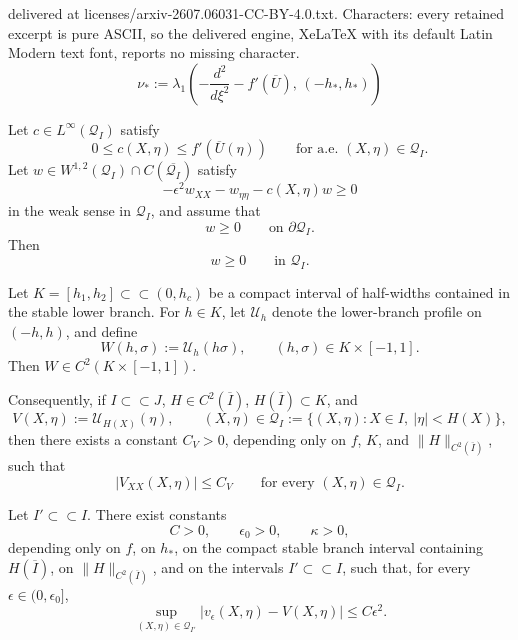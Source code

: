 \documentclass[10pt,a4paper]{amsart}
\begin{document}
delivered at licenses/arxiv-2607.06031-CC-BY-4.0.txt. Characters: every retained excerpt is pure ASCII, so the delivered engine, XeLaTeX with its default Latin Modern text font, reports no missing character.
\begin{equation}\label{eq:defn-mu-star}
    \nu_*:=\lambda_1\left(-\frac{d^2}{d\xi^2}-f'(\overline U),\,(-h_*,h_*)\right)
\end{equation}

\begin{lemma} \label{lem:slow-channel-maximum}
Let $c\in L^\infty(\mathcal Q_I)$ satisfy
$$
0\le c(X,\eta)\le f'(\overline U(\eta))
\qquad\text{for a.e. }(X,\eta)\in\mathcal Q_I.
$$
Let $w\in W^{1,2}(\mathcal Q_I)\cap C(\overline{\mathcal Q_I})$ satisfy
$$
-\epsilon^2 w_{XX}-w_{\eta\eta}-c(X,\eta)w\ge0
$$
in the weak sense in $\mathcal Q_I$, and assume that
$$
w\ge0\qquad\text{on }\partial\mathcal Q_I.
$$
Then
$$
w\ge0\qquad\text{in }\mathcal Q_I.
$$
\end{lemma}

\begin{lemma}
\label{lem:slow-profile-xbounds}
Let $K=[h_1,h_2]\subset\subset(0,h_c)$ be a compact interval of half-widths contained in the stable lower branch. For $h\in K$, let $\mathcal U_h$ denote the lower-branch profile on $(-h,h)$, and define
$$
W(h,\sigma):=\mathcal U_h(h\sigma),
\qquad
(h,\sigma)\in K\times[-1,1].
$$
Then $W\in C^2(K\times[-1,1])$. 

Consequently, if $I\subset\subset J$, 
$H\in C^2(\overline I)$,   $H(\overline I)\subset K$, and 
$$
V(X,\eta):=\mathcal U_{H(X)}(\eta),
\qquad
(X,\eta)\in\mathcal Q_I:=\{(X,\eta):X\in I,\ |\eta|<H(X)\},
$$
then there exists a constant $C_V>0$, depending only on $f$, $K$, and
$\|H\|_{C^2(\overline I)}$, such that
$$
|V_{XX}(X,\eta)|\le C_V
\qquad\text{for every }(X,\eta)\in\mathcal Q_I.
$$
\end{lemma}

\begin{proposition}\label{prop:c0-approx}
Let $I'\subset\subset I$.  There exist constants
$$
C>0,
\qquad
\epsilon_0>0,
\qquad
\kappa>0,
$$
depending only on $f$, on $h_*$, on the compact stable branch interval
containing $H(\overline I)$, on $\|H\|_{C^2(\overline I)}$, and on the
intervals $I'\subset\subset I$, such that, for every $\epsilon\in(0,\epsilon_0]$,
$$
\sup_{(X,\eta)\in\mathcal Q_{I'}}
|v_\epsilon(X,\eta)-V(X,\eta)|
\le C\epsilon^2.
$$
\end{proposition}
\end{document}
